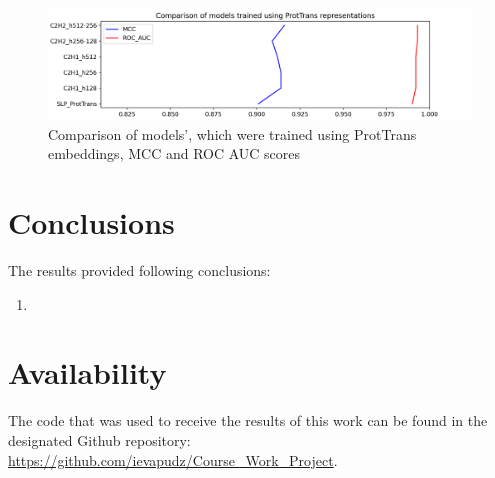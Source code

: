 \documentclass[12pt]{article}
\begin{document}
	\begin{figure}[h!]
		\centering
		\includegraphics[scale=0.6]{MLP_PT.png}

		\caption{Comparison of models', which were trained using 
		ProtTrans embeddings, MCC and ROC AUC scores}
		\label{figure:scoresMLP_PT}
	\end{figure}

	\newpage

	\section{Conclusions}

	The results provided following conclusions:

	\begin{enumerate}
		\item 
	\end{enumerate}

	\newpage

	\section{Availability}

	The code that was used to receive the results of this work can be found
	in the designated Github repository: 
	\href{https://github.com/ievapudz/Course_Work_Project}{https://github.com/ievapudz/Course\_Work\_Project}.

	\newpage
	
	\nocite{*}
	
	\normalsize

 

\end{document}
